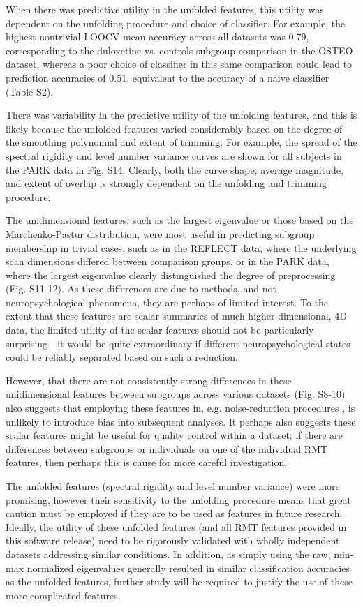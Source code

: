 \documentclass[10pt]{article}
\begin{document}
When there was predictive utility in the unfolded features,	 this utility was dependent on the
unfolding procedure and choice of classifier. For example, the highest nontrivial LOOCV mean
accuracy across all datasets was 0.79, corresponding to the duloxetine vs. controls subgroup
comparison in the OSTEO dataset, whereas a poor choice of classifier in this same comparison could
lead to prediction accuracies of 0.51, equivalent to the accuracy of a naive classifier (Table S2).

There was variability in the predictive utility of the unfolding features, and this is likely
because the unfolded features varied considerably based on the degree of the smoothing polynomial
and extent of trimming. For example, the spread of the spectral rigidity and level number variance
curves are shown for all subjects in the PARK data in Fig. S14. Clearly, both the curve shape,
average magnitude, and extent of overlap is strongly dependent on the unfolding and trimming
procedure.

The unidimensional features, such as the largest eigenvalue or those based on the Marchenko-Pastur
distribution, were most useful in predicting subgroup membership in trivial cases, such as in the
REFLECT data, where the underlying scan dimensions differed between comparison groups, or in the
PARK data, where the largest eigenvalue clearly distinguished the degree of preprocessing (Fig.
S11-12). As these differences are due to methods, and not neuropsychological phenomena, they are
perhaps of limited interest. To the extent that these features are scalar summaries of much
higher-dimensional, 4D data, the limited utility of the scalar features should not be particularly
surprising—it would be quite extraordinary if different neuropsychological states could be reliably
separated based on such a reduction.

However, that there are not consistently strong differences in these unidimensional features between
subgroups across various datasets (Fig. S8-10) also suggests that employing these features in, e.g.
noise-reduction procedures
\citep[as in][]{veraartDiffusionMRINoise2016,veraartDenoisingDiffusionMRI2016}, is unlikely to introduce bias
into subsequent analyses. It perhaps also suggests these scalar features might be useful for quality
control within a dataset: if there are differences between subgroups or individuals on one of the
individual RMT features, then perhaps this is cause for more careful investigation.

The unfolded features (spectral rigidity and level number variance) were more promising, however
their sensitivity to the unfolding procedure means that great caution must be employed if they are
to be used as features in future research. Ideally, the utility of these unfolded features (and all
RMT features provided in this software release) need to be rigorously validated with wholly
independent datasets addressing similar conditions. In addition, as simply using the raw, min-max
normalized eigenvalues generally resulted in similar classification accuracies as the unfolded
features, further study will be required to justify the use of these more complicated features.
\end{document}
